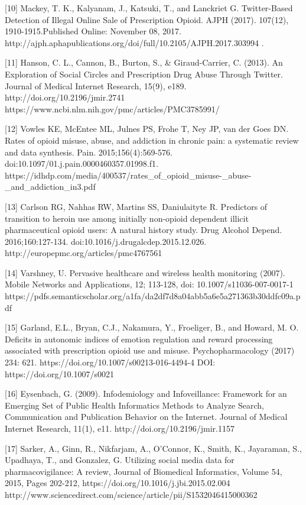 [10] Mackey, T. K., Kalyanam, J., Katsuki, T., and Lanckriet G. Twitter-Based Detection of Illegal Online Sale of Prescription Opioid. AJPH (2017). 107(12), 1910-1915.Published Online: November 08, 2017.
http://ajph.aphapublications.org/doi/full/10.2105/AJPH.2017.303994 . 

[11] Hanson, C. L., Cannon, B., Burton, S., & Giraud-Carrier, C. (2013). An Exploration of Social Circles and Prescription Drug Abuse Through Twitter. Journal of Medical Internet Research, 15(9), e189. http://doi.org/10.2196/jmir.2741
https://www.ncbi.nlm.nih.gov/pmc/articles/PMC3785991/ 

[12] Vowles KE, McEntee ML, Julnes PS, Frohe T, Ney JP, van der Goes DN. Rates of opioid misuse, abuse, and addiction in chronic pain: a systematic review and data synthesis. Pain. 2015;156(4):569-576. doi:10.1097/01.j.pain.0000460357.01998.f1.
https://idhdp.com/media/400537/rates_of_opioid_misuse-_abuse-_and_addiction_in3.pdf 

[13] Carlson RG, Nahhas RW, Martins SS, Daniulaityte R. Predictors of transition to heroin use among initially non-opioid dependent illicit pharmaceutical opioid users: A natural history study. Drug Alcohol Depend. 2016;160:127-134. doi:10.1016/j.drugalcdep.2015.12.026. 
http://europepmc.org/articles/pmc4767561 

[14] Varshney, U. Pervasive healthcare and wireless health monitoring (2007). Mobile Networks and Applications, 12; 113-128, doi: 10.1007/s11036-007-0017-1
https://pdfs.semanticscholar.org/a1fa/da2df7d8a04abb5a6e5a271363b30ddfc09a.pdf 

[15] Garland, E.L., Bryan, C.J., Nakamura, Y., Froeliger, B., and Howard, M. O. Deficits in autonomic indices of emotion regulation and reward processing associated with prescription opioid use and misuse. Psychopharmacology (2017) 234: 621. https://doi.org/10.1007/s00213-016-4494-4 DOI: https://doi.org/10.1007/s0021 

[16] Eysenbach, G. (2009). Infodemiology and Infoveillance: Framework for an Emerging Set of Public Health Informatics Methods to Analyze Search, Communication and Publication Behavior on the Internet. Journal of Medical Internet Research, 11(1), e11. http://doi.org/10.2196/jmir.1157 

[17] Sarker, A., Ginn, R., Nikfarjam, A., O’Connor, K., Smith, K., Jayaraman, S., Upadhaya, T., and Gonzalez, G. Utilizing social media data for pharmacovigilance: A review, Journal of Biomedical Informatics, Volume 54, 2015, Pages 202-212, https://doi.org/10.1016/j.jbi.2015.02.004 
http://www.sciencedirect.com/science/article/pii/S1532046415000362 

